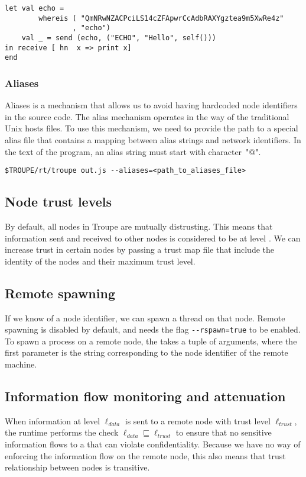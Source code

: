 \begin{lstlisting}
let val echo = 
        whereis ( "QmNRwNZACPciLS14cZFApwrCcAdbRAXYgztea9m5XwRe4z"
                , "echo")
    val _ = send (echo, ("ECHO", "Hello", self()))
in receive [ hn  x => print x]
end    
\end{lstlisting}

\subsubsection{Aliases}
Aliases is a mechanism that allows us to avoid having hardcoded node identifiers in the source code. 
The alias mechanism operates in the way of the traditional Unix hosts files.
To use this mechanism, we need to provide the path to a special alias file that contains a mapping between
alias strings and network identifiers. In the text of the program, an alias string must start with character~"@".


\begin{verbatim}
$TROUPE/rt/troupe out.js --aliases=<path_to_aliases_file>
\end{verbatim}

\subsection{Node trust levels}

By default, all nodes in Troupe are mutually distrusting. This means that 
information sent and received to other nodes is considered to be at level \lev{}.
We can increase trust in certain nodes by 
passing a trust map file that include the identity of the nodes and their maximum
trust level.

    
\subsection{Remote spawning}
If we know of a node identifier, we can spawn a thread on that node. Remote spawning is 
disabled by default, and needs the flag {\verb|--rspawn=true|} to be enabled.
%
To spawn a process on a remote node, the  takes a tuple of arguments,
where the first parameter is the string corresponding to the node identifier of the remote machine.


\subsection{Information flow monitoring and attenuation}
When information at level $\ell_{\mathit{data}}$ is sent to a remote node with trust level 
$\ell_{\mathit{trust}}$, the runtime performs the check
$\ell_{\mathit{data}} \sqsubseteq \ell_{\mathit{trust}}$ to ensure that no sensitive information 
flows to a that can violate confidentiality. Because we have no way of enforcing the 
information flow on the remote node, this also means that 
trust relationship between nodes is transitive.

